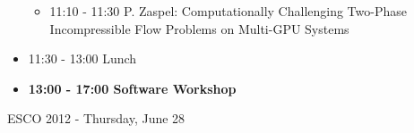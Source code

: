 \documentclass[10pt, A4]{article}%
\begin{document}
\begin{itemize}
\begin{itemize}
    \item 11:10 - 11:30 P. Zaspel: Computationally Challenging Two-Phase Incompressible Flow Problems on Multi-GPU Systems
  \end{itemize}
  \item 11:30 - 13:00 Lunch
  \item {\bf 13:00 - 17:00 Software Workshop}
\end{itemize}

\newpage

\centerline{\huge ESCO 2012 - Thursday, June 28}
\vspace{4mm}
\end{document}

